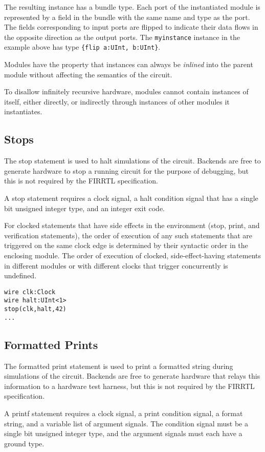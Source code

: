 \documentclass[12pt]{article}
\begin{document}
The resulting instance has a bundle type. Each port of the instantiated module is represented by a field in the bundle with the same name and type as the port. The fields corresponding to input ports are flipped to indicate their data flows in the opposite direction as the output ports. The \verb|myinstance| instance in the example above has type \verb|{flip a:UInt, b:UInt}|.

Modules have the property that instances can always be {\em inlined} into the parent module without affecting the semantics of the circuit.

To disallow infinitely recursive hardware, modules cannot contain instances of itself, either directly, or indirectly through instances of other modules it instantiates.

\subsection{Stops} \label{stop_stmt}
The stop statement is used to halt simulations of the circuit. Backends are free to generate hardware to stop a running circuit for the purpose of debugging, but this is not required by the FIRRTL specification.

A stop statement requires a clock signal, a halt condition signal that has a single bit unsigned integer type, and an integer exit code.

For clocked statements that have side effects in the environment (stop, print, and verification
statements), the order of execution of any such statements that are triggered on the same clock edge
is determined by their syntactic order in the enclosing module. The order of execution of clocked,
side-effect-having statements in different modules or with different clocks that trigger
concurrently is undefined.

\begin{lstlisting}
wire clk:Clock
wire halt:UInt<1>
stop(clk,halt,42)
...
\end{lstlisting}

\subsection{Formatted Prints}
The formatted print statement is used to print a formatted string during simulations of the circuit. Backends are free to generate hardware that relays this information to a hardware test harness, but this is not required by the FIRRTL specification.

A printf statement requires a clock signal, a print condition signal, a format string, and a variable list of argument signals. The condition signal must be a single bit unsigned integer type, and the argument signals must each have a ground type.
\end{document}
